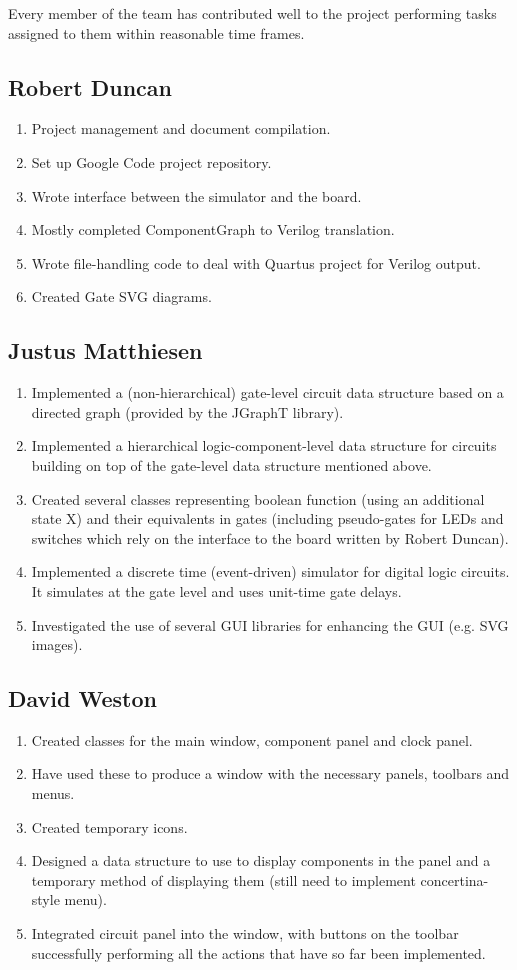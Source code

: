 \documentclass[12pt, a4paper, oneside,titlepage]{article}
\begin{document}
Every member of the team has contributed well to the project performing tasks assigned to them within reasonable time frames.
\subsection{Robert Duncan}
\begin{enumerate}
\item Project management and document compilation. 
\item Set up Google Code project repository.
\item Wrote interface between the simulator and the board.
\item Mostly completed ComponentGraph to Verilog translation. 
\item Wrote file-handling code to deal with Quartus project for Verilog output. 
\item Created Gate SVG diagrams.
\end{enumerate}
\subsection{Justus Matthiesen}
\begin{enumerate}
\item Implemented a (non-hierarchical) gate-level circuit data structure based on 
a directed graph (provided by the JGraphT library).
\item Implemented a hierarchical logic-component-level data structure for circuits 
building on top of the gate-level data structure mentioned above.
\item Created several classes representing boolean function (using an additional 
state X) and their equivalents in gates (including pseudo-gates for LEDs and 
switches which rely on the interface to the board written by Robert Duncan).
\item Implemented a discrete time (event-driven) simulator for digital logic 
circuits. It simulates at the gate level and uses unit-time gate delays.
\item Investigated the use of several GUI libraries for enhancing the GUI (e.g. 
SVG images).
\end{enumerate}
\subsection{David Weston}
\begin{enumerate}
\item Created classes for the main window, component panel and clock panel.
\item Have used these to produce a window with the necessary panels, toolbars and menus.
\item Created temporary icons.
\item Designed a data structure to use to display components in the panel and a temporary method of displaying them
(still need to implement concertina-style menu). 
\item Integrated circuit panel into the window, with buttons on the toolbar successfully performing all the actions that have so far been implemented.
\end{enumerate}
\end{document}
